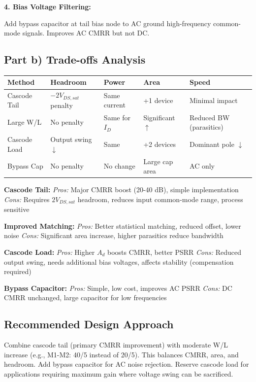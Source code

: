 \documentclass[main.tex]{subfiles}
\begin{document}
\textbf{4. Bias Voltage Filtering:}

Add bypass capacitor at tail bias node to AC ground high-frequency common-mode signals. Improves AC CMRR but not DC.

\subsection*{Part b) Trade-offs Analysis}

\begin{table}[H]
\centering
\small
\begin{tabular}{|p{2.5cm}|p{2cm}|p{1.8cm}|p{1.5cm}|p{2cm}|}
\hline
\textbf{Method} & \textbf{Headroom} & \textbf{Power} & \textbf{Area} & \textbf{Speed} \\
\hline
Cascode Tail & $-2V_{DS,sat}$ penalty & Same current & +1 device & Minimal impact \\
\hline
Large W/L & No penalty & Same for $I_D$ & Significant $\uparrow$ & Reduced BW (parasitics) \\
\hline
Cascode Load & Output swing $\downarrow$ & Same & +2 devices & Dominant pole $\downarrow$ \\
\hline
Bypass Cap & No penalty & No change & Large cap area & AC only \\
\hline
\end{tabular}
\end{table}

\textbf{Cascode Tail:}
\textit{Pros:} Major CMRR boost (20-40 dB), simple implementation
\textit{Cons:} Requires $2V_{DS,sat}$ headroom, reduces input common-mode range, process sensitive

\textbf{Improved Matching:}
\textit{Pros:} Better statistical matching, reduced offset, lower noise
\textit{Cons:} Significant area increase, higher parasitics reduce bandwidth

\textbf{Cascode Load:}
\textit{Pros:} Higher $A_d$ boosts CMRR, better PSRR
\textit{Cons:} Reduced output swing, needs additional bias voltages, affects stability (compensation required)

\textbf{Bypass Capacitor:}
\textit{Pros:} Simple, low cost, improves AC PSRR
\textit{Cons:} DC CMRR unchanged, large capacitor for low frequencies

\subsection*{Recommended Design Approach}

Combine cascode tail (primary CMRR improvement) with moderate W/L increase (e.g., M1-M2: 40/5 instead of 20/5). This balances CMRR, area, and headroom. Add bypass capacitor for AC noise rejection. Reserve cascode load for applications requiring maximum gain where voltage swing can be sacrificed.
\end{document}

